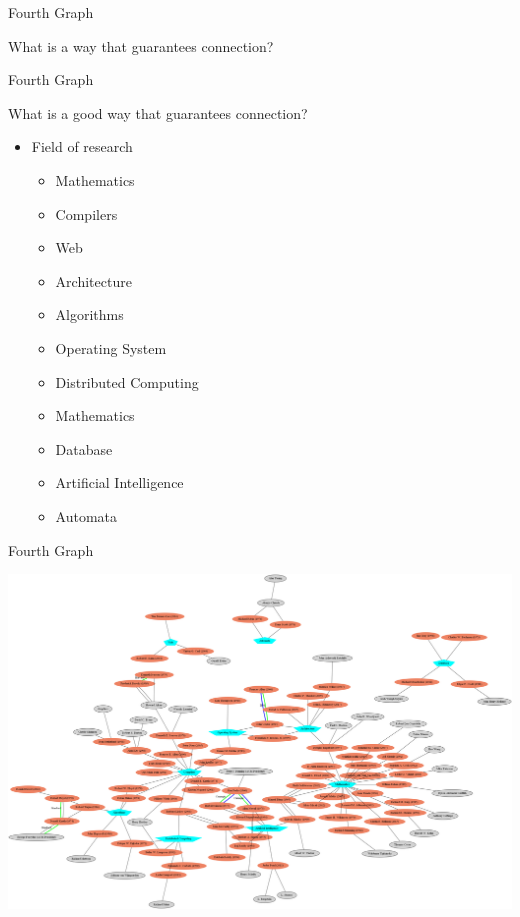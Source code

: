 \documentclass[11pt,aspectratio=169]{beamer}
\begin{document}
\begin{frame}{Fourth Graph}
    \begin{center}
        What is a way that guarantees connection?
    \end{center}
\end{frame}

\begin{frame}{Fourth Graph}
    \begin{center}
        What is a good way that guarantees connection?
    \end{center}
    \pause
    \begin{itemize}
        \item Field of research \pause
        \begin{itemize}
            \item Mathematics
            \item Compilers
            \item Web
            \item Architecture
            \item Algorithms
            \item Operating System
            \item Distributed Computing
            \item Mathematics
            \item Database
            \item Artificial Intelligence
            \item Automata
        \end{itemize}
    \end{itemize}
\end{frame}

\begin{frame}{Fourth Graph}
    \vspace{-0.25cm}
        \begin{center}
            \includegraphics[scale=0.1]{neatorel5.png}
        \end{center}
\end{frame}
\end{document}
